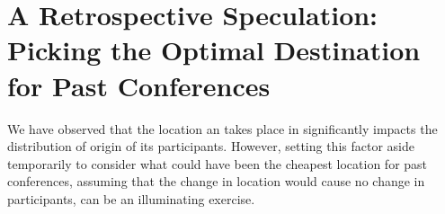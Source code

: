 








\section{A Retrospective Speculation: Picking the Optimal Destination for Past Conferences}
\label{sec:speculate}

We have observed that the location an \event takes place in significantly
impacts the distribution of origin of its participants. However, setting
this factor aside temporarily to consider what could have been the cheapest
location for past conferences, assuming that the change in location would
cause no change in participants, can be an illuminating exercise.

